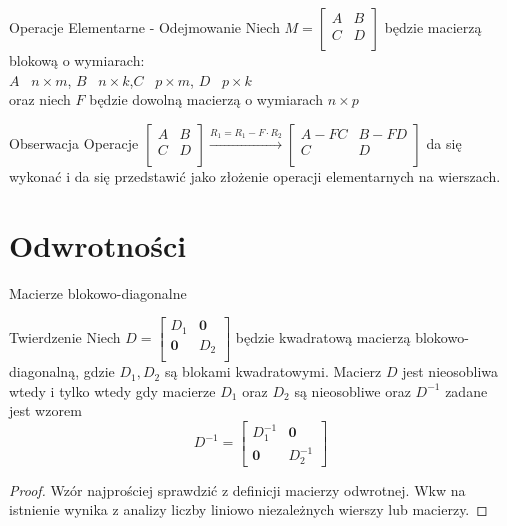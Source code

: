 \documentclass{beamer}
\newcommand{\zero}{\mathbf{0}}
\begin{document}
\begin{frame}{Operacje Elementarne - Odejmowanie}
    Niech $M = \begin{bmatrix}
        A & B \\ C & D \\ 
    \end{bmatrix}$ będzie macierzą blokową o wymiarach: \\
    $A$ \textendash \ $n \times m$, \quad$B$ \textendash \ $n \times k$,\quad $C$ \textendash \ $p \times m$, \quad $D$ \textendash \ $p \times k$ \\
    oraz niech $F$ będzie dowolną macierzą o wymiarach $n \times p$
    \begin{alertblock}{Obserwacja}
        Operacje $\begin{bmatrix}
            A & B \\ C & D \\
        \end{bmatrix} \xrightarrow{R_1 = R_1 -  F \cdot R_2} \begin{bmatrix}
            A - F  C & B - F D \\ C & D \\ 
        \end{bmatrix}$ da się wykonać i da się przedstawić jako złożenie operacji elementarnych na wierszach.
    \end{alertblock}
\end{frame}
\section{Odwrotności}

\begin{frame}{Macierze blokowo-diagonalne}
    \begin{block}{Twierdzenie}
        Niech $D = \begin{bmatrix}
            D_1 & \zero \\ \zero & D_2 \\ 
        \end{bmatrix}$
        będzie kwadratową macierzą blokowo-diagonalną, gdzie $D_1, D_2$ są blokami kwadratowymi. Macierz $D$ jest nieosobliwa wtedy i tylko wtedy gdy macierze 
        $D_1$ oraz $D_2$ są nieosobliwe oraz $D^{-1}$ zadane jest wzorem
        $$ D^{-1} = \begin{bmatrix}
            D_{1}^{-1} & \zero \\ \zero & D_{2}^{-1}
        \end{bmatrix}$$
    \end{block}
    \pause 
    \begin{proof}
        Wzór najprościej sprawdzić z definicji macierzy odwrotnej. 
        Wkw na istnienie wynika z analizy liczby liniowo niezależnych wierszy lub macierzy. 
    \end{proof}
\end{frame}
\end{document}
